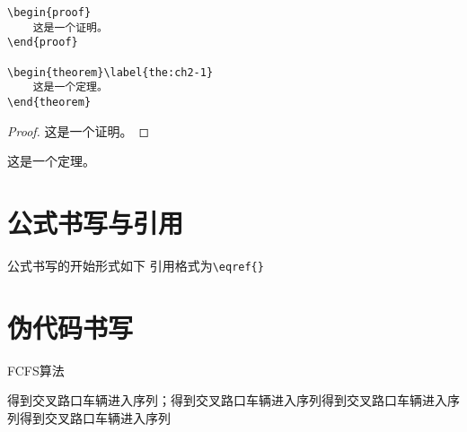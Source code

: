 \begin{lstlisting}
\begin{proof}
	这是一个证明。
\end{proof}

\begin{theorem}\label{the:ch2-1}
	这是一个定理。
\end{theorem}
\end{lstlisting}

\begin{proof}
	这是一个证明。
\end{proof}

\begin{theorem}\label{the:ch2-1}
	这是一个定理。
\end{theorem}

\section{公式书写与引用}
公式书写的开始形式如下
引用格式为\lstinline!\eqref{}!


\section{伪代码书写}
\begin{algorithm} [htb]           
    \DontPrintSemicolon %
	\caption{FCFS算法}
    \label{algo:revi-1}  
	得到交叉路口车辆进入序列；得到交叉路口车辆进入序列得到交叉路口车辆进入序列得到交叉路口车辆进入序列 \\
\end{algorithm}
